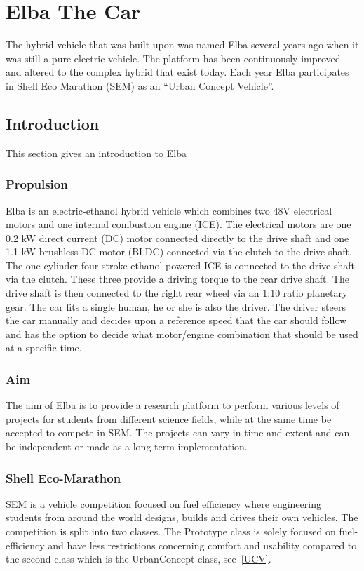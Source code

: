 \chapter{Elba The Car}
The hybrid vehicle that was built upon was named Elba several years ago when it
was still a pure electric vehicle. The platform has been continuously improved
and altered to the complex hybrid that exist today. Each year Elba participates
in Shell Eco Marathon (SEM) as an ``Urban Concept Vehicle''.

\section{Introduction}
This section gives an introduction to Elba
\subsection{Propulsion}
Elba is an electric-ethanol hybrid vehicle which combines two 48V electrical
motors and one internal combustion engine (ICE). The electrical motors are one
0.2 kW direct current (DC) motor connected directly to the drive shaft and one
1.1 kW brushless DC motor (BLDC) connected via the clutch to the drive shaft.
The one-cylinder four-stroke ethanol powered ICE is connected to the drive
shaft via the clutch. These three provide a driving torque to the rear drive
shaft. The drive shaft is then connected to the right rear wheel via an 1:10
ratio planetary gear. The car fits a single human, he or she is also the
driver. The driver steers the car manually and decides upon a reference speed
that the car should follow and has the option to decide what motor/engine
combination that should be used at a specific time.

\subsection{Aim}
The aim of Elba is to provide a research platform to perform various levels of
projects for students from different science fields, while at the same time be
accepted to compete in SEM\@. The projects can vary in time and
extent and can be independent or made as a long term implementation.

\subsection{Shell Eco-Marathon}
SEM is a vehicle competition focused on fuel efficiency where engineering
students from around the world designs, builds and drives their own vehicles.
The competition is split into two classes. The Prototype class is solely
focused on fuel-efficiency and have less restrictions concerning comfort and
usability compared to the second class which is the UrbanConcept class,
see~\ref{UCV}.


